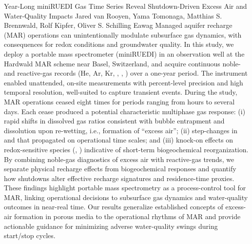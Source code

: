 \begin{conf-abstract}
{Year-Long miniRUEDI Gas Time Series Reveal Shutdown-Driven Excess Air and Water-Quality Impacts}
{Jared van Rooyen, Yama Tomonaga, Matthias S. Brennwald, Rolf Kipfer, Oliver S. Schilling}
{Eawag}
{Managed aquifer recharge (MAR) operations can unintentionally modulate subsurface gas dynamics, with consequences for redox conditions and groundwater quality. In this study, we deploy a portable mass spectrometer (miniRUEDI) in an observation well at the Hardwald MAR scheme near Basel, Switzerland, and acquire continuous noble- and reactive-gas records (He, Ar, Kr, , , ) over a one-year period. The instrument enabled unattended, on-site measurements with percent-level precision and high temporal resolution, well-suited to capture transient events. During the study, MAR operations ceased eight times for periods ranging from hours to several days. Each cease produced a potential characteristic multiphase gas response: (i) rapid shifts in dissolved gas ratios consistent with bubble entrapment and dissolution upon re-wetting, i.e., formation of “excess air”; (ii) step-changes in  and  that propagated on operational time scales; and (iii) knock-on effects on redox-sensitive species (, ) indicative of short-term biogeochemical reorganization. By combining noble-gas diagnostics of excess air with reactive-gas trends, we separate physical recharge effects from biogeochemical responses and quantify how shutdowns alter effective recharge signatures and residence-time proxies. These findings highlight portable mass spectrometry as a process-control tool for MAR, linking operational decisions to subsurface gas dynamics and water-quality outcomes in near-real time. Our results generalize established concepts of excess-air formation in porous media to the operational rhythms of MAR and provide actionable guidance for minimizing adverse water-quality swings during start/stop cycles.}
\end{conf-abstract}
